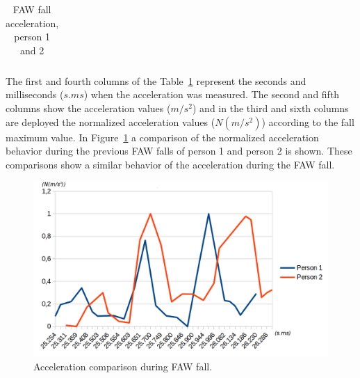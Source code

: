 \documentclass[review]{elsarticle}
\begin{document}
\begin{table}[!ht]
	\centering
	\begin{tabular}{*{5}{r}}
		
	\end{tabular}
	\caption{FAW fall acceleration, person 1 and 2}%
	\label{tabla:FAW}
\end{table}

The first and fourth columns of the Table~\ref{tabla:FAW} represent the seconds and milliseconds ($s.ms$) when the acceleration was measured. The second and fifth columns show the acceleration values ($m/s^2$) and in the third and sixth columns are deployed the normalized acceleration values 
($N(m/s^2)$) according to the fall maximum value. In Figure~\ref{fig:FAWcomparison} a comparison of the normalized acceleration behavior during the previous FAW falls of person 1 and person 2 is shown. These comparisons show a similar behavior of the acceleration during the FAW fall. \newpage

\begin{figure}[!ht]
	\centering
	\includegraphics[scale=0.26]{Images/TwoFallsComparative.png}
	\caption[Acceleration during FAW fall]{Acceleration comparison during FAW fall.}
	\label{fig:FAWcomparison}
\end{figure}
\end{document}
